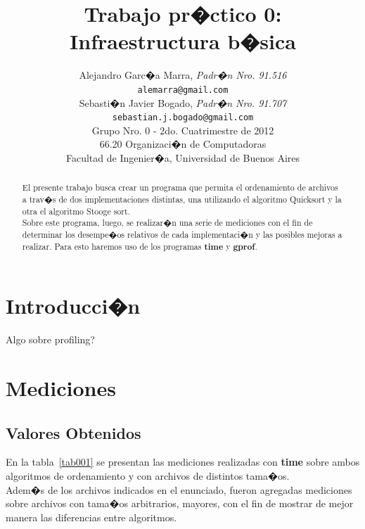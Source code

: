 \documentclass[a4paper,10pt]{article}
\title{		\textbf{Trabajo pr�ctico 0: Infraestructura b�sica}}
\author{	Alejandro Garc�a Marra, \textit{Padr�n Nro. 91.516}                     \\
            \texttt{ alemarra@gmail.com }                                              \\
            Sebasti�n Javier Bogado, \textit{Padr�n Nro. 91.707}                     \\
            \texttt{ sebastian.j.bogado@gmail.com }                                              \\
            \normalsize{Grupo Nro. 0 - 2do. Cuatrimestre de 2012}                       \\
            \normalsize{66.20 Organizaci�n de Computadoras}                             \\
            \normalsize{Facultad de Ingenier�a, Universidad de Buenos Aires}            \\
       }
\date{}
\begin{document}
\maketitle

\thispagestyle{empty}

\begin{abstract}

El presente trabajo busca crear un programa que permita el ordenamiento de archivos a trav�s de dos implementaciones distintas, una utilizando el algoritmo Quicksort y la otra el algoritmo Stooge sort.\\
Sobre este programa, luego, se realizar�n una serie de mediciones con el fin de determinar los desempe�os relativos de cada implementaci�n y las posibles mejoras a realizar. 
Para esto haremos uso de los programas \textbf{time} y \textbf{gprof}.

\end{abstract}


\section{Introducci�n}

Algo sobre profiling?

\newpage

\section{Mediciones}

\subsection{Valores Obtenidos}

En la tabla~\ref{tab001} se presentan las mediciones realizadas con \textbf{time} sobre ambos algoritmos de ordenamiento y con archivos de distintos tama�os.\\

Adem�s de los archivos indicados en el enunciado, fueron agregadas mediciones sobre archivos con tama�os arbitrarios, mayores, con el fin de mostrar de mejor manera las diferencias entre algoritmos.
\end{document}
